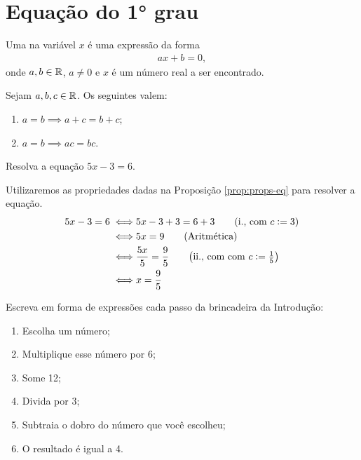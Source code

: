 \section{Equação do 1° grau}

\begin{definition}
Uma  na variável $x$ é uma expressão da forma
%
\begin{align*}
ax+b=0,
\end{align*}
%
onde $a,b \in \mathbb{R}$, $a \neq 0$ e $x$ é um número real a ser encontrado.
\end{definition}

\begin{proposition}[Propriedades]
\label{prop:props-eq}
Sejam $a, b, c \in \mathbb{R}$. Os seguintes valem:
\begin{enumerate}
  \item $a=b \implies a+c = b+c$;
  \item $a=b \implies ac = bc$.
\end{enumerate}
\end{proposition}

\begin{example}
Resolva a equação $5x-3=6$.
\end{example}

\begin{solution}
Utilizaremos as propriedades dadas na Proposição \ref{prop:props-eq} para resolver a equação.
%
\begin{align*}
5x-3=6 \iff & 5x -3+3=6+3 \tag*{$\left(\text{i., com }c := 3\right) $}\\
	   \iff & 5x =9 \tag*{(Aritmética)}\\ 
	   \iff & \frac{5x}{5} =\frac 9 5 \tag*{$\left(\text{ii., com com } c := \frac 1 5 \right) $}\\
	   \iff & x =\frac 9 5 
\end{align*}
\end{solution}

\begin{example}
Escreva em forma de expressões cada passo da brincadeira da Introdução:
\begin{enumerate}[label=\textbf{\arabic*}.]
  \item Escolha um número;
  \item Multiplique esse número por 6;
  \item Some 12;
  \item Divida por 3;
  \item Subtraia o dobro do número que você escolheu;
  \item O resultado é igual a 4.
\end{enumerate}
\end{example}

